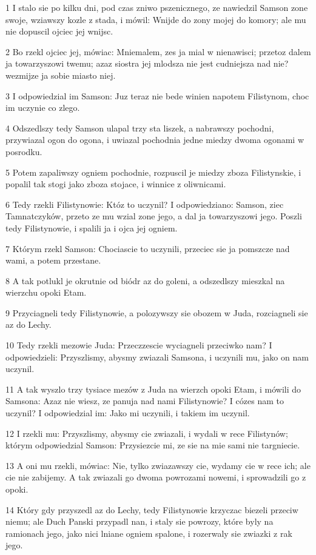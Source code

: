\par 1 I stalo sie po kilku dni, pod czas zniwo pszenicznego, ze nawiedzil Samson zone swoje, wziawszy kozle z stada, i mówil: Wnijde do zony mojej do komory; ale mu nie dopuscil ojciec jej wnijsc.
\par 2 Bo rzekl ojciec jej, mówiac: Mniemalem, zes ja mial w nienawisci; przetoz dalem ja towarzyszowi twemu; azaz siostra jej mlodsza nie jest cudniejsza nad nie? wezmijze ja sobie miasto niej.
\par 3 I odpowiedzial im Samson: Juz teraz nie bede winien napotem Filistynom, choc im uczynie co zlego.
\par 4 Odszedlszy tedy Samson ulapal trzy sta liszek, a nabrawszy pochodni, przywiazal ogon do ogona, i uwiazal pochodnia jedne miedzy dwoma ogonami w posrodku.
\par 5 Potem zapaliwszy ogniem pochodnie, rozpuscil je miedzy zboza Filistynskie, i popalil tak stogi jako zboza stojace, i winnice z oliwnicami.
\par 6 Tedy rzekli Filistynowie: Któz to uczynil? I odpowiedziano: Samson, ziec Tamnatczyków, przeto ze mu wzial zone jego, a dal ja towarzyszowi jego. Poszli tedy Filistynowie, i spalili ja i ojca jej ogniem.
\par 7 Którym rzekl Samson: Chociascie to uczynili, przeciec sie ja pomszcze nad wami, a potem przestane.
\par 8 A tak potlukl je okrutnie od biódr az do goleni, a odszedlszy mieszkal na wierzchu opoki Etam.
\par 9 Przyciagneli tedy Filistynowie, a polozywszy sie obozem w Juda, rozciagneli sie az do Lechy.
\par 10 Tedy rzekli mezowie Juda: Przeczzescie wyciagneli przeciwko nam? I odpowiedzieli: Przyszlismy, abysmy zwiazali Samsona, i uczynili mu, jako on nam uczynil.
\par 11 A tak wyszlo trzy tysiace mezów z Juda na wierzch opoki Etam, i mówili do Samsona: Azaz nie wiesz, ze panuja nad nami Filistynowie? I cózes nam to uczynil? I odpowiedzial im: Jako mi uczynili, i takiem im uczynil.
\par 12 I rzekli mu: Przyszlismy, abysmy cie zwiazali, i wydali w rece Filistynów; którym odpowiedzial Samson: Przysiezcie mi, ze sie na mie sami nie targniecie.
\par 13 A oni mu rzekli, mówiac: Nie, tylko zwiazawszy cie, wydamy cie w rece ich; ale cie nie zabijemy. A tak zwiazali go dwoma powrozami nowemi, i sprowadzili go z opoki.
\par 14 Który gdy przyszedl az do Lechy, tedy Filistynowie krzyczac biezeli przeciw niemu; ale Duch Panski przypadl nan, i staly sie powrozy, które byly na ramionach jego, jako nici lniane ogniem spalone, i rozerwaly sie zwiazki z rak jego.
